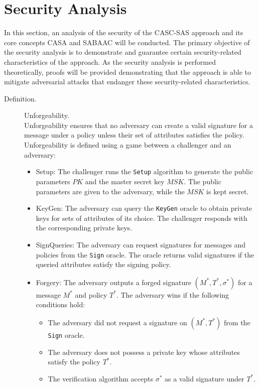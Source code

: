 \section{Security Analysis}
In this section, an analysis of the security of the CASC-SAS approach and its core concepts CASA and SABAAC will be conducted.
The primary objective of the security analysis is to demonstrate and guarantee certain security-related characteristics of the approach.
As the security analysis is performed theoretically, proofs will be provided demonstrating that the approach is able to mitigate adversarial attacks that endanger these security-related characteristics.
\begin{description}
    \item[Definition.] Unforgeability.\\
    Unforgeability ensures that no adversary can create a valid signature for a message under a policy unless their set of attributes satisfies the policy.
    Unforgeability is defined using a game between a challenger and an adversary:
    \begin{itemize}
        \item Setup: The challenger runs the \texttt{Setup} algorithm to generate the public parameters $PK$ and the master secret key $MSK$. The public parameters are given to the adversary, while the $MSK$ is kept secret.

        \item KeyGen: The adversary can query the \texttt{KeyGen} oracle to obtain private keys for sets of attributes of its choice. The challenger responds with the corresponding private keys.

        \item SignQueries: The adversary can request signatures for messages and policies from the \texttt{Sign} oracle. The oracle returns valid signatures if the queried attributes satisfy the signing policy.

        \item Forgery: The adversary outputs a forged signature $(M^*, T^*, \sigma^*)$ for a message $M^*$ and policy $T^*$. The adversary wins if the following conditions hold:
        \begin{itemize}
            \item The adversary did not request a signature on $(M^*, T^*)$ from the \texttt{Sign} oracle.
            \item The adversary does not possess a private key whose attributes satisfy the policy $T^*$.
            \item The verification algorithm accepts $\sigma^*$ as a valid signature under $T^*$.
        \end{itemize}
    \end{itemize}


\end{description}
